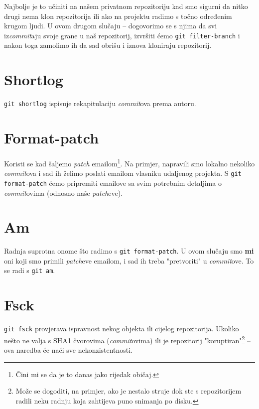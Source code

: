 Najbolje je to učiniti na našem privatnom repozitoriju kad smo sigurni da nitko drugi nema klon repozitorija ili ako na projektu radimo s točno određenim krugom ljudi.
U ovom drugom slučaju -- dogovorimo se s njima da svi iz\emph{commit}aju svoje grane u naš repozitorij, izvršiti ćemo \verb+git filter-branch+ i nakon toga zamolimo ih da sad obrišu i iznova kloniraju repozitorij.

\section*{Shortlog}

\verb+git shortlog+ ispisuje rekapitulaciju \emph{commit}ova prema autoru.

\section*{Format-patch}

Koristi se kad šaljemo \emph{patch} emailom\footnote{Čini mi se da je to danas jako rijedak običaj.}.
Na primjer, napravili smo lokalno nekoliko \emph{commit}ova i sad ih želimo poslati emailom vlasniku udaljenog projekta.
S \verb+git format-patch+ ćemo pripremiti emailove sa svim potrebnim detaljima o \emph{commit}ovima (odnosno naše \emph{patch}eve).

\section*{Am}

Radnja suprotna onome što radimo s \verb+git format-patch+.
U ovom slučaju smo \textbf{mi} oni koji smo primili \emph{patch}eve emailom, i sad ih treba "pretvoriti" u \emph{commit}ove.
To se radi s \verb+git am+.

\section*{Fsck}

\verb+git fsck+ provjerava ispravnost nekog objekta ili cijelog repozitorija.
Ukoliko nešto ne valja s SHA1 čvorovima (\emph{commit}ovima) ili je repozitorij "koruptiran"\footnote{Može se dogoditi, na primjer, ako je nestalo struje dok ste s repozitorijem radili neku radnju koja zahtijeva puno snimanja po disku.} -- ova naredba će naći sve nekonzistentnosti.

